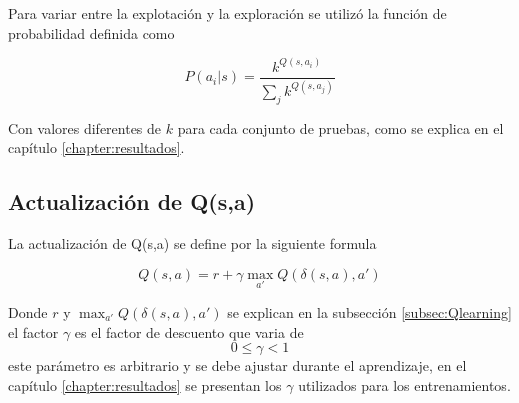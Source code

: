 Para variar entre la explotación y la exploración se utiliz\'o la función de probabilidad definida como  %


\begin{equation}
 P(a_{i} | s) = \dfrac{k^{Q(s,a_{i})}}{\sum_{j}k^{Q(s,a_{j})}}
\end{equation}

Con valores diferentes de $k$ para cada conjunto de pruebas, como se explica en el capítulo \ref{chapter:resultados}.  
 
 
\subsection{Actualizaci\'on de Q(s,a)}

La actualizaci\'on de Q(s,a) se define por la siguiente formula 
 
\begin{equation}
Q (s,a) = r + {\gamma\max_{a'}} Q(\delta(s ,a ) , a') 
\end{equation} 



Donde $r$ y $\max_{a'} Q(\delta(s,a),a')$ se explican en la subsecci\'on \ref{subsec:Qlearning} el factor $\gamma$ es el factor de descuento que varia de \[   0 \leq  \gamma < 1 \] este par\'ametro es arbitrario y se debe ajustar durante el aprendizaje, en el cap\'itulo \ref{chapter:resultados}  se presentan los $\gamma$ utilizados para los entrenamientos.